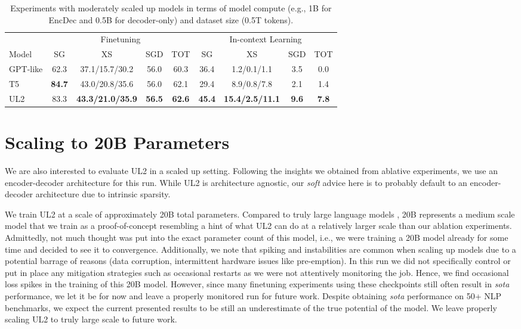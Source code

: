 \documentclass[10pt]{article}
\begin{document}
\begin{table}[H]
    \centering
     \caption{Experiments with moderately scaled up models in terms of model compute (e.g., 1B for EncDec and 0.5B for decoder-only) and dataset size (0.5T tokens).}
    \label{tab:scale}
  \begin{tabular}{lcccccccc}
    \toprule
    & \multicolumn{4}{c}{Finetuning} & \multicolumn{4}{c}{In-context Learning}\\
    Model  & SG & XS & SGD & TOT & SG & XS & SGD & TOT  \\
    \midrule
    GPT-like  & 62.3 &37.1/15.7/30.2& 56.0& 60.3 & 36.4 & 1.2/0.1/1.1 & 3.5 & 0.0\\ 
        T5   & \textbf{84.7} & 43.0/20.8/35.6 & 56.0 & 62.1&29.4 & 8.9/0.8/7.8  & 2.1 & 1.4 \\
        UL2  & 83.3 & \textbf{43.3/21.0/35.9}  & \textbf{56.5}& \textbf{62.6} & \textbf{45.4} & \textbf{15.4/2.5/11.1} & \textbf{9.6} & \textbf{7.8} \\
\bottomrule
    \end{tabular}
\end{table}


\section{Scaling to 20B Parameters} 
We are also interested to evaluate UL2 in a scaled up setting. Following the insights we obtained from ablative experiments, we use an encoder-decoder architecture for this run. While UL2 is architecture agnostic, our \textit{soft} advice here is to probably default to an encoder-decoder architecture due to intrinsic sparsity. 

We train UL2 at a scale of approximately 20B total parameters. Compared to truly large language models \citep{du2021glam,chowdhery2022palm}, 20B represents a medium scale model that we train as a proof-of-concept resembling a hint of what UL2 can do at a relatively larger scale than our ablation experiments. Admittedly, not much thought was put into the exact parameter count of this model, i.e., we were training a 20B model already for some time and decided to see it to convergence. Additionally, we note that spiking and instabilities are common when scaling up models due to a potential barrage of reasons (data corruption, intermittent hardware issues like pre-emption). In this run we did not specifically control or put in place any mitigation strategies such as occasional restarts as we were not attentively monitoring the job. Hence, we find occasional loss spikes in the training of this 20B model. However, since many finetuning experiments using these checkpoints still often result in \emph{sota} performance, we let it be for now and leave a properly monitored run for future work. Despite obtaining \textit{sota} performance on 50+ NLP benchmarks, we expect the current presented results to be still an underestimate of the true potential of the model. We leave properly scaling UL2 to truly large scale to future work.
\end{document}
